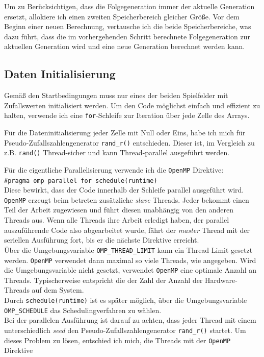 \documentclass[german,plainarticle,hyperref,utf8]{zihpub}
\begin{document}
	Um zu Berücksichtigen, dass die Folgegeneration immer der aktuelle Generation ersetzt, allokiere ich einen zweiten Speicherbereich gleicher Größe. Vor dem Beginn einer neuen Berechnung, vertausche ich die beide Speicherbereiche, was dazu führt, dass die im vorhergehenden Schritt berechnete Folgegeneration zur aktuellen Generation wird und eine neue Generation berechnet werden kann.
	
	\subsection{Daten Initialisierung}
	Gemäß den Startbedingungen muss nur eines der beiden Spielfelder mit Zufallswerten initialisiert werden.
	Um den Code möglichst einfach und effizient zu halten, verwende ich eine \texttt{for}-Schleife zur Iteration über jede Zelle des Arrays.
	
	Für die Dateninitialisierung jeder Zelle mit Null oder Eins, habe ich mich für Pseudo-Zufallszahlengenerator \texttt{rand\_r()} entschieden. Dieser ist, im Vergleich zu z.B. \texttt{rand()} Thread-sicher und kann Thread-parallel ausgeführt werden.
	
	Für die eigentliche Parallelisierung verwende ich die \texttt{OpenMP} Direktive:\\
	
	\texttt{\#pragma omp parallel for schedule(runtime)}\\
	
	Diese bewirkt, dass der Code innerhalb der Schleife parallel ausgeführt wird. \texttt{OpenMP} erzeugt beim betreten zusätzliche \textit{slave} Threads. Jeder bekommt einen Teil der Arbeit zugewiesen und führt diesen unabhängig von den anderen Threads aus. Wenn alle Threads ihre Arbeit erledigt haben, der parallel auszuführende Code also abgearbeitet wurde, fährt der \textit{master} Thread mit der seriellen Ausführung fort, bis er die nächste Direktive erreicht.\\
	Über die Umgebungsvariable \texttt{OMP\_THREAD\_LIMIT} kann ein Thread Limit gesetzt werden. \texttt{OpenMP} verwendet dann maximal so viele Threads, wie angegeben. Wird die Umgebungsvariable nicht gesetzt, verwendet \texttt{OpenMP} eine optimale Anzahl an Threads. Typischerweise entspricht die der Zahl der Anzahl der Hardware-Threads auf dem System.\\
	Durch \texttt{schedule(runtime)} ist es später möglich, über die Umgebungsvariable \texttt{OMP\_SCHEDULE} das Schedulingverfahren zu wählen.\\
	Bei der parallelen Ausführung ist darauf zu achten, dass jeder Thread mit einem unterschiedlich \textit{seed} den Pseudo-Zufallszahlengenerator \texttt{rand\_r()} startet. Um dieses Problem zu lösen, entschied ich mich, die Threads mit der \texttt{OpenMP} Direktive \\
	
\end{document}
